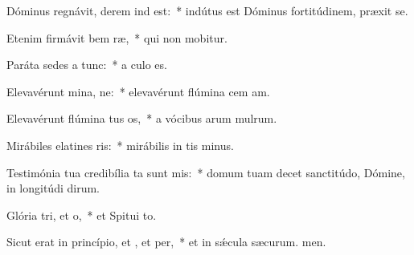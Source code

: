 \item Dóminus regnávit, derem ind est:~* indútus est Dóminus fortitúdinem,  præxit se.
\item Etenim firmávit bem ræ,~* qui non mobitur.
\item Paráta sedes a  tunc:~* a culo  es.
\item Elevavérunt mina, ne:~* elevavérunt flúmina cem am.
\item Elevavérunt flúmina tus os,~* a vócibus arum mulrum.
\item Mirábiles elatines ris:~* mirábilis in tis minus.
\item Testimónia tua credibília ta sunt mis:~* domum tuam decet sanctitúdo, Dómine, in longitúdi dirum.
\item Glória tri, et o,~* et Spitui to.
\item Sicut erat in princípio, et , et per,~* et in sǽcula sæcurum. men.
